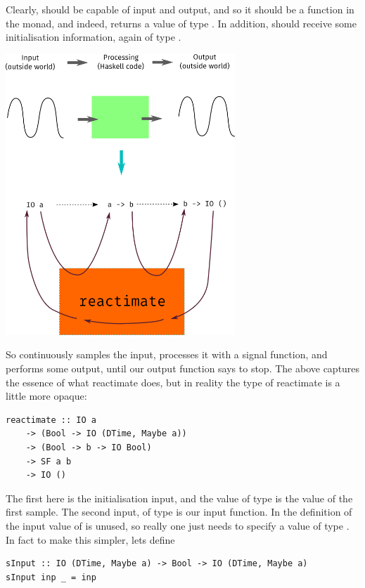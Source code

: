 Clearly,  should be capable of input and output, and so it should be a function in the  monad, and indeed,  returns a value of type . In addition,  should receive some initialisation information, again of type .

\includegraphics[height=300pt]{Diagrams/overview.png}

So  continuously samples the input, processes it with a signal function, and performs some output, until our output function says to stop. The above captures the essence of what reactimate does, but in reality the type of reactimate is a little more opaque:

\begin{lstlisting}
reactimate :: IO a
    -> (Bool -> IO (DTime, Maybe a))
    -> (Bool -> b -> IO Bool)
    -> SF a b
    -> IO ()
\end{lstlisting}

The first  here is the initialisation input, and the value of type  is the value of the first sample. The second input, of type  is our input function. In the definition of  the input value of  is unused, so really one just needs to specify a value of type . In fact to make this simpler, lets define

\begin{lstlisting}
sInput :: IO (DTime, Maybe a) -> Bool -> IO (DTime, Maybe a)
sInput inp _ = inp
\end{lstlisting}

